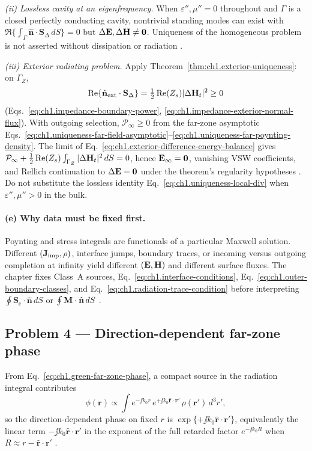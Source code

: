 \textit{(ii) Lossless cavity at an eigenfrequency.} When $\varepsilon'',\mu''=0$ throughout and $\Gamma$ is a closed perfectly conducting cavity, nontrivial standing modes can exist with $\Re\{\int_\Gamma\hat{\mathbf{n}}\cdot\mathbf{S}_\Delta\,dS\}=0$ but $\Delta\mathbf{E},\Delta\mathbf{H}\neq\mathbf{0}$. Uniqueness of the homogeneous problem is not asserted without dissipation or radiation \cite{stratton1941,sommerfeld1949}.

\textit{(iii) Exterior radiating problem.} Apply Theorem~\ref{thm:ch1.exterior-uniqueness}: on $\Gamma_Z$,
\[
\Re\{\hat{\mathbf{n}}_{\mathrm{ext}}\cdot\mathbf{S}_\Delta\}=\tfrac12\Re(Z_s)|\Delta\mathbf{H}_t|^2\ge0
\]
(Eqs.~\eqref{eq:ch1.impedance-boundary-power}, \eqref{eq:ch1.impedance-exterior-normal-flux}). With outgoing selection, $\mathcal{P}_\infty\ge0$ from the far-zone asymptotic Eqs.~\eqref{eq:ch1.uniqueness-far-field-asymptotic}--\eqref{eq:ch1.uniqueness-far-poynting-density}. The limit of Eq.~\eqref{eq:ch1.exterior-difference-energy-balance} gives $\mathcal{P}_\infty+\tfrac12\Re(Z_s)\int_{\Gamma_Z}|\Delta\mathbf{H}_t|^2\,dS=0$, hence $\mathbf{E}_\infty=\mathbf{0}$, vanishing VSW coefficients, and Rellich continuation to $\Delta\mathbf{E}=\mathbf{0}$ under the theorem's regularity hypotheses \cite{stratton1941,sommerfeld1949}. Do not substitute the lossless identity Eq.~\eqref{eq:ch1.uniqueness-local-div} when $\varepsilon'',\mu''>0$ in the bulk.

\paragraph{(e) Why data must be fixed first.}
Poynting and stress integrals are functionals of a particular Maxwell solution. Different $(\mathbf{J}_{\mathrm{imp}},\rho)$, interface jumps, boundary traces, or incoming versus outgoing completion at infinity yield different $(\mathbf{E},\mathbf{H})$ and different surface fluxes. The chapter fixes Class~A sources, Eq.~\eqref{eq:ch1.interface-conditions}, Eq.~\eqref{eq:ch1.outer-boundary-classes}, and Eq.~\eqref{eq:ch1.radiation-trace-condition} before interpreting $\oint\mathbf{S}_\mathrm{c}\cdot\hat{\mathbf{n}}\,dS$ or $\oint\mathbf{M}\cdot\hat{\mathbf{n}}\,dS$ \cite{stratton1941,maxwell1873}.

\subsection*{Problem 4 --- Direction-dependent far-zone phase}

From Eq.~\eqref{eq:ch1.green-far-zone-phase}, a compact source in the radiation integral contributes
\[
\phi(\mathbf{r})\propto\int e^{-\jj k_0 r}\,e^{+\jj k_0\hat{\mathbf{r}}\cdot\mathbf{r}'}\,\rho(\mathbf{r}')\,d^3r',
\]
so the direction-dependent phase on fixed $r$ is $\exp\{+\jj k_0\hat{\mathbf{r}}\cdot\mathbf{r}'\}$, equivalently the linear term $-\jj k_0\hat{\mathbf{r}}\cdot\mathbf{r}'$ in the exponent of the full retarded factor $e^{-\jj k_0 R}$ when $R\approx r-\hat{\mathbf{r}}\cdot\mathbf{r}'$ \cite{stratton1941,jackson1999}.


